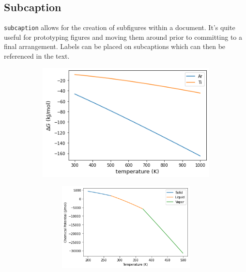     \subsection{Subcaption}
%
\verb|subcaption| allows for the creation of subfigures within a document.
It's quite useful for prototyping figures and moving them around prior to committing to a final arrangement.
Labels can be placed on subcaptions which can then be referenced in the text.
\begin{figure}[H]
    \centering
    \begin{subfigure}{0.6\textwidth}
        \centering
        \includegraphics[width=\textwidth,keepaspectratio]{figures/DeltaG.png}
        \caption{}
        \label{fig:example1}
    \end{subfigure}
    \begin{subfigure}{0.3\textwidth}
        \begin{subfigure}{\textwidth}
            \centering
            \includegraphics[width=\textwidth,keepaspectratio]{figures/equilibriumplot.png}

\end{subfigure}
\end{subfigure}
\end{figure}
